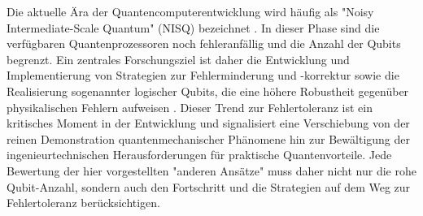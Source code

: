 \newline \newline
Die aktuelle Ära der Quantencomputerentwicklung wird häufig als "Noisy \linebreak Intermediate-Scale Quantum" (NISQ) bezeichnet \cite{chengNoisyIntermediatescaleQuantum2023}. In dieser Phase sind die verfügbaren Quantenprozessoren noch fehleranfällig und die Anzahl der Qubits begrenzt. Ein zentrales Forschungsziel ist daher die Entwicklung und Implementierung von Strategien zur Fehlerminderung und -korrektur sowie die Realisierung sogenannter logischer Qubits, die eine höhere Robustheit gegenüber physikalischen Fehlern aufweisen \cite{QuantumHardwareExplained}. Dieser Trend zur Fehlertoleranz ist ein kritisches Moment in der Entwicklung und signalisiert eine Verschiebung von der reinen Demonstration quantenmechanischer Phänomene hin zur Bewältigung der ingenieurtechnischen Herausforderungen für praktische Quantenvorteile. Jede Bewertung der hier vorgestellten "anderen Ansätze" muss daher nicht nur die rohe Qubit-Anzahl, sondern auch den Fortschritt und die Strategien auf dem Weg zur Fehlertoleranz berücksichtigen.



% 

